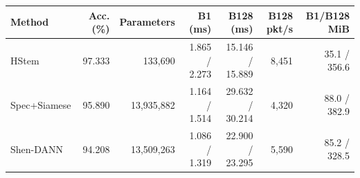 \begin{tabular}{lrrrrrr}
\toprule Method & Acc. (\%) & Parameters & B1 (ms) & B128 (ms) & B128 pkt/s & B1/B128 MiB\\
\midrule
HStem & 97.333 & 133,690 & 1.865 / 2.273 & 15.146 / 15.889 & 8,451 & 35.1 / 356.6\\
Spec+Siamese & 95.890 & 13,935,882 & 1.164 / 1.514 & 29.632 / 30.214 & 4,320 & 88.0 / 382.9\\
Shen-DANN & 94.208 & 13,509,263 & 1.086 / 1.319 & 22.900 / 23.295 & 5,590 & 85.2 / 328.5\\
\bottomrule
\end{tabular}
